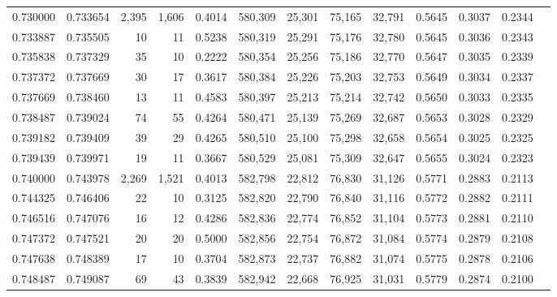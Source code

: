 \begin{tabular}{rrrrrrrrrrrrr}
0.730000 & 0.733654 &  2,395 & 1,606 &                                     0.4014 & 580,309 &  25,301 &  75,165 &  32,791 & 0.5645 & 0.3037 & 0.2344 \\
0.733887 & 0.735505 &     10 &    11 &                                     0.5238 & 580,319 &  25,291 &  75,176 &  32,780 & 0.5645 & 0.3036 & 0.2343 \\
0.735838 & 0.737329 &     35 &    10 &                                     0.2222 & 580,354 &  25,256 &  75,186 &  32,770 & 0.5647 & 0.3035 & 0.2339 \\
0.737372 & 0.737669 &     30 &    17 &                                     0.3617 & 580,384 &  25,226 &  75,203 &  32,753 & 0.5649 & 0.3034 & 0.2337 \\
0.737669 & 0.738460 &     13 &    11 &                                     0.4583 & 580,397 &  25,213 &  75,214 &  32,742 & 0.5650 & 0.3033 & 0.2335 \\
0.738487 & 0.739024 &     74 &    55 &                                     0.4264 & 580,471 &  25,139 &  75,269 &  32,687 & 0.5653 & 0.3028 & 0.2329 \\
0.739182 & 0.739409 &     39 &    29 &                                     0.4265 & 580,510 &  25,100 &  75,298 &  32,658 & 0.5654 & 0.3025 & 0.2325 \\
0.739439 & 0.739971 &     19 &    11 &                                     0.3667 & 580,529 &  25,081 &  75,309 &  32,647 & 0.5655 & 0.3024 & 0.2323 \\
0.740000 & 0.743978 &  2,269 & 1,521 &                                     0.4013 & 582,798 &  22,812 &  76,830 &  31,126 & 0.5771 & 0.2883 & 0.2113 \\
0.744325 & 0.746406 &     22 &    10 &                                     0.3125 & 582,820 &  22,790 &  76,840 &  31,116 & 0.5772 & 0.2882 & 0.2111 \\
0.746516 & 0.747076 &     16 &    12 &                                     0.4286 & 582,836 &  22,774 &  76,852 &  31,104 & 0.5773 & 0.2881 & 0.2110 \\
0.747372 & 0.747521 &     20 &    20 &                                     0.5000 & 582,856 &  22,754 &  76,872 &  31,084 & 0.5774 & 0.2879 & 0.2108 \\
0.747638 & 0.748389 &     17 &    10 &                                     0.3704 & 582,873 &  22,737 &  76,882 &  31,074 & 0.5775 & 0.2878 & 0.2106 \\
0.748487 & 0.749087 &     69 &    43 &                                     0.3839 & 582,942 &  22,668 &  76,925 &  31,031 & 0.5779 & 0.2874 & 0.2100 \\

\end{tabular}
